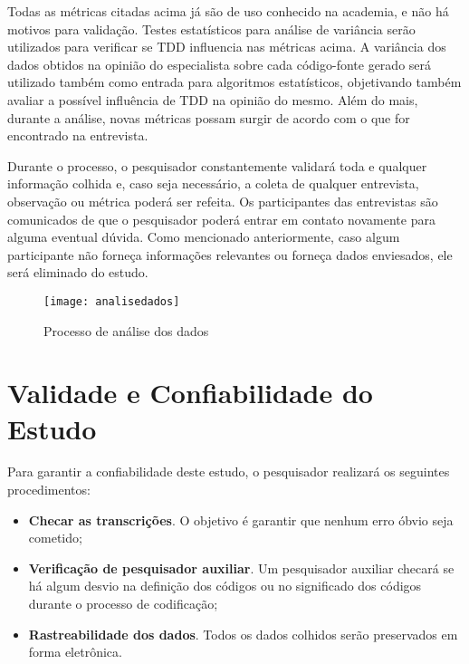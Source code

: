 Todas as métricas citadas acima já são de uso conhecido na academia, e não há 
motivos para validação. Testes estatísticos para análise de variância serão utilizados
para verificar se TDD influencia nas métricas acima.
A variância dos dados obtidos na opinião do especialista sobre cada código-fonte gerado
será utilizado também como entrada para algoritmos estatísticos, objetivando também
avaliar a possível influência de TDD na opinião do mesmo. Além do mais, durante a análise, novas
métricas possam surgir de acordo com o que for encontrado na entrevista.

Durante o processo, o pesquisador constantemente validará toda e qualquer
informação colhida e, caso seja necessário, a coleta de qualquer entrevista,
observação ou métrica poderá ser refeita. Os participantes das entrevistas
são comunicados de que o pesquisador poderá entrar em contato
novamente para alguma eventual dúvida.
Como mencionado anteriormente, caso algum participante não forneça informações
relevantes ou forneça dados enviesados, ele será eliminado do estudo.

\begin{figure}
  \centering
  \texttt{[image: analisedados]}
  \caption{Processo de análise dos dados}
  \label{fig:analise-dados}
\end{figure}

\section{Validade e Confiabilidade do Estudo}
\label{sec:planejamento-validacao}

Para garantir a confiabilidade deste estudo, o pesquisador realizará os
seguintes procedimentos:

\begin{itemize}
	\item \textbf{Checar as transcrições}. O objetivo é garantir que nenhum erro
	óbvio seja cometido;

	\item \textbf{Verificação de pesquisador auxiliar}. Um pesquisador auxiliar
	checará se há algum desvio na definição dos códigos ou no significado dos códigos 
	durante o processo de codificação;
	
	\item \textbf{Rastreabilidade dos dados}. Todos os dados colhidos serão
	preservados em forma eletrônica.

\end{itemize}

